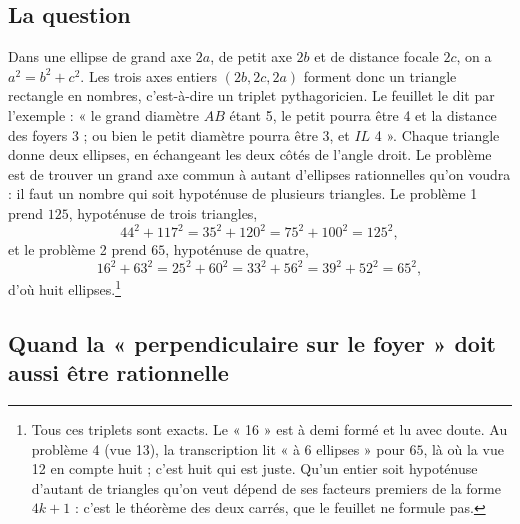 \documentclass[11pt,a4paper]{article}
\begin{document}
\subsection*{La question}

Dans une ellipse de grand axe \(2a\), de petit axe \(2b\) et de distance focale
\(2c\), on a \(a^2=b^2+c^2\). Les trois axes entiers \((2b,2c,2a)\) forment
donc un triangle rectangle en nombres, c'est-à-dire un triplet pythagoricien.
Le feuillet le dit par l'exemple : « le grand diamètre \(AB\) étant 5, le petit
pourra être 4 et la distance des foyers 3 ; ou bien le petit diamètre pourra
être 3, et \(IL\) 4 ». Chaque triangle donne deux ellipses, en échangeant les
deux côtés de l'angle droit. Le problème est de trouver un grand axe commun à
autant d'ellipses rationnelles qu'on voudra : il faut un nombre qui soit
hypoténuse de plusieurs triangles. Le problème 1 prend \(125\), hypoténuse de
trois triangles,
\[
44^2+117^2=35^2+120^2=75^2+100^2=125^2,
\]
et le problème 2 prend \(65\), hypoténuse de quatre,
\[
16^2+63^2=25^2+60^2=33^2+56^2=39^2+52^2=65^2,
\]
d'où huit ellipses.\footnote{Tous ces triplets sont exacts. Le « 16 » est à
demi formé et lu avec doute. Au problème 4 (vue 13), la transcription lit « à
6 ellipses » pour \(65\), là où la vue 12 en compte huit ; c'est huit qui est
juste. Qu'un entier soit hypoténuse d'autant de triangles qu'on veut dépend de
ses facteurs premiers de la forme \(4k+1\) : c'est le théorème des deux carrés,
que le feuillet ne formule pas.}

\subsection*{Quand la « perpendiculaire sur le foyer » doit aussi être rationnelle}
\end{document}

